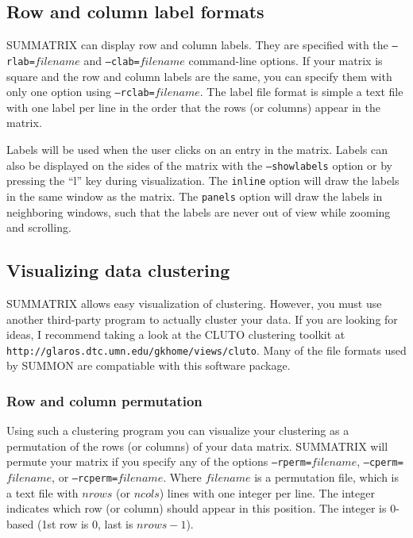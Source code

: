 \documentclass[12pt]{article}
\newcommand{\code}[1]{{\tt #1}}
\begin{document}
\subsection{Row and column label formats}

SUMMATRIX can display row and column labels.  They are specified with the 
\code{--rlab=$filename$} and \code{--clab=$filename$} command-line options.  If
your matrix is square and the row and column labels are the same, you can
specify them with only one option using \code{--rclab=$filename$}.  The label
file format is simple a text file with one label per line in the order that the
rows (or columns) appear in the matrix.

Labels will be used when the user clicks on an entry in the matrix.  Labels can
also be displayed on the sides of the matrix with the \code{--showlabels} option
or by pressing the ``l'' key during visualization.  The \code{inline} option
will draw the labels in the same window as the matrix.  The \code{panels} option
will draw the labels in neighboring windows, such that the labels are never out
of view while zooming and scrolling.



\subsection{Visualizing data clustering}

SUMMATRIX allows easy visualization of clustering.  However, you must use
another  third-party program to actually cluster your data.  If you are looking
for ideas, I recommend taking a look at the CLUTO clustering toolkit at 
\code{http://glaros.dtc.umn.edu/gkhome/views/cluto}.  Many of the file formats
used by SUMMON are compatiable with this software package.

\subsubsection{Row and column permutation}

Using such a clustering program you can visualize your clustering as a
permutation of the rows (or columns) of your data matrix.  SUMMATRIX will
permute your matrix if you specify any of the options 
\code{--rperm=$filename$}, \code{--cperm=$filename$}, or 
\code{--rcperm=$filename$}.  Where $filename$ is a permutation file, which is a
text file with $nrows$ (or $ncols$) lines with one integer per line. 
The integer indicates which row (or column) should appear in this position. The
integer is 0-based (1st row is 0, last is $nrows-1$).
\end{document}
